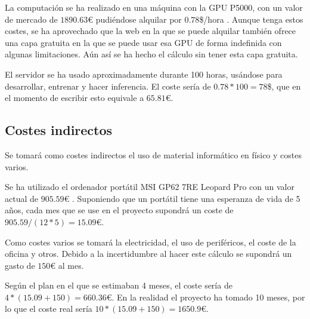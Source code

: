 La computación se ha realizado en una máquina con la GPU P5000, con un valor de mercado de $1890.63$€ \cite{amazonp5000} pudiéndose alquilar por $0.78$\$/hora \cite{gradientdocs}. Aunque tenga estos costes, se ha aprovechado que la web en la que se puede alquilar también ofrece una capa gratuita en la que se puede usar esa GPU de forma indefinida con algunas limitaciones. Aún así se ha hecho el cálculo sin tener esta capa gratuita.

El servidor se ha usado aproximadamente durante 100 horas, usándose para desarrollar, entrenar y hacer inferencia. El coste sería de $0.78 * 100 = 78$\$, que en el momento de escribir esto equivale a $65.81$€.

\subsection{Costes indirectos}\label{sec:costesindirectos}

Se tomará como costes indirectos el uso de material informático en físico y costes varios.

Se ha utilizado el ordenador portátil MSI GP62 7RE Leopard Pro con un valor actual de $905.59$€ \cite{pccomponentes}. Suponiendo que un portátil tiene una esperanza de vida de 5 años, cada mes que se use en el proyecto supondrá un coste de $905.59 / (12*5) = 15.09$€.

Como costes varios se tomará la electricidad, el uso de periféricos, el coste de la oficina y otros. Debido a la incertidumbre al hacer este cálculo se supondrá un gasto de $150$€ al mes.

Según el plan en el que se estimaban 4 meses, el coste sería de $4 * (15.09 + 150) = 660.36$€. En la realidad el proyecto ha tomado 10 meses, por lo que el coste real sería $10 * (15.09 + 150) = 1650.9$€.